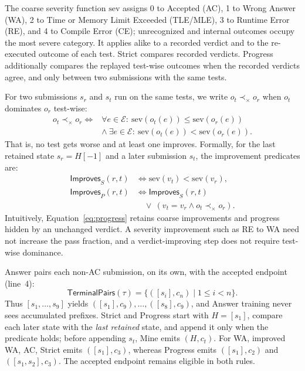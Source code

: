\documentclass[10pt,conference]{IEEEtran}
\begin{document}
The coarse severity function \(\mathrm{sev}\) assigns 0 to Accepted (AC), 1 to Wrong Answer (WA), 2 to Time or Memory Limit Exceeded (TLE/MLE), 3 to Runtime Error (RE), and 4 to Compile Error (CE); unrecognized and internal outcomes occupy the most severe category. It applies alike to a recorded verdict and to the re-executed outcome of each test. Strict compares recorded verdicts. Progress additionally compares the replayed test-wise outcomes when the recorded verdicts agree, and only between two submissions with the same tests.

For two submissions \(s_r\) and \(s_t\) run on the same tests, we write \(o_t\prec_\times o_r\) when \(o_t\) dominates \(o_r\) test-wise:
\[
\begin{aligned}
o_t\prec_\times o_r\iff{}&\forall e\in\mathcal E:\ \mathrm{sev}(o_t(e))\le\mathrm{sev}(o_r(e))\\
&\land\ \exists e\in\mathcal E:\ \mathrm{sev}(o_t(e))<\mathrm{sev}(o_r(e)).
\end{aligned}
\]
That is, no test gets worse and at least one improves. Formally, for the last retained state \(s_r=H[-1]\) and a later submission \(s_t\), the improvement predicates are:
\begin{equation}
\begin{aligned}
\mathsf{Improves}_S(r,t)&\iff \mathrm{sev}(v_t)<\mathrm{sev}(v_r),\\
\mathsf{Improves}_P(r,t)&\iff \mathsf{Improves}_S(r,t)\\
 &\quad\lor\ (v_t=v_r\land o_t\prec_\times o_r).
\end{aligned}
\label{eq:progress}
\end{equation}
Intuitively, Equation~\eqref{eq:progress} retains coarse improvements and progress hidden by an unchanged verdict. A severity improvement such as RE to WA need not increase the pass fraction, and a verdict-improving step does not require test-wise dominance.

Answer pairs each non-AC submission, on its own, with the accepted endpoint (line~4):
\[
 \mathsf{TerminalPairs}(\tau)=\{([s_i],c_n)\mid 1\le i<n\}.
\]
Thus \([s_1,\ldots,s_9]\) yields \(([s_1],c_9),\ldots,([s_8],c_9)\), and Answer training never sees accumulated prefixes. Strict and Progress start with \(H=[s_1]\), compare each later state with the \emph{last retained} state, and append it only when the predicate holds; before appending \(s_t\), Mine emits \((H,c_t)\). For WA, improved WA, AC, Strict emits \(([s_1],c_3)\), whereas Progress emits \(([s_1],c_2)\) and \(([s_1,s_2],c_3)\). The accepted endpoint remains eligible in both rules.
\end{document}

